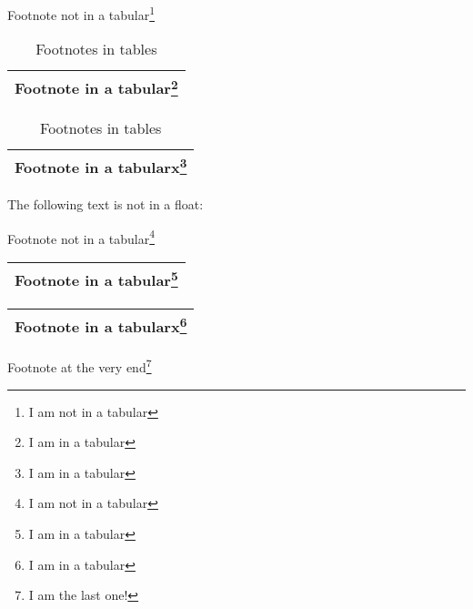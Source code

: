 \begin{table}
  Footnote not in a tabular\footnote{I am not in a tabular}

  \begin{tabular}{|l|}
  \hline
    Footnote  in a tabular\footnote{I am in a tabular}\\
  \hline
  \end{tabular}

  \begin{tabularx}{\textwidth}{|l|}
  \hline
    Footnote  in a tabularx\footnote{I am in a tabular}\\
  \hline
  \end{tabularx}
  \caption{Footnotes in tables}
\end{table}

The following text is not in a float:

  Footnote not in a tabular\footnote{I am not in a tabular}

  \begin{tabular}{|l|}
  \hline
    Footnote  in a tabular\footnote{I am in a tabular}\\
  \hline
  \end{tabular}

  \begin{tabularx}{\textwidth}{|l|}
  \hline
    Footnote  in a tabularx\footnote{I am in a tabular}\\
  \hline
  \end{tabularx}

  Footnote at the very end\footnote{I am the last one!}
  \newpage
